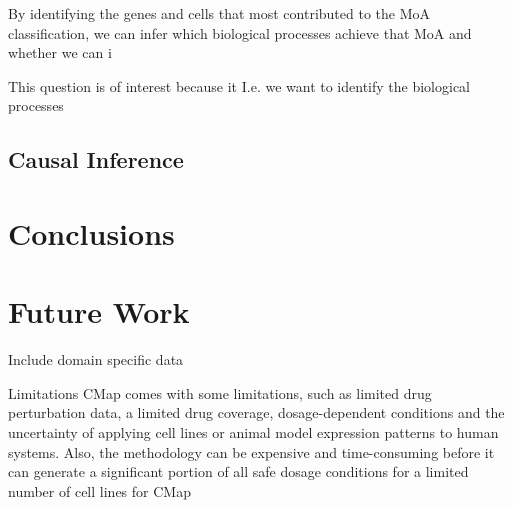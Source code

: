 \documentclass[bsc,frontabs,twoside,singlespacing,parskip,deptreport]{infthesis}     %
\begin{document}
By identifying the genes and cells that most contributed to the MoA classification, we can infer which biological processes achieve that MoA and whether we can i

This question is of interest because it  I.e. we want to identify the biological processes

\section{Causal Inference}

\chapter{Conclusions}

\chapter{Future Work}
Include domain specific data

Limitations
CMap comes with some limitations, such as limited drug perturbation data, a limited drug coverage, dosage-dependent conditions and the uncertainty of applying cell lines or animal model expression patterns to human systems. Also, the methodology can be expensive and time-consuming before it can generate a significant portion of all safe dosage conditions for a limited number of cell lines for CMap



\end{document}
